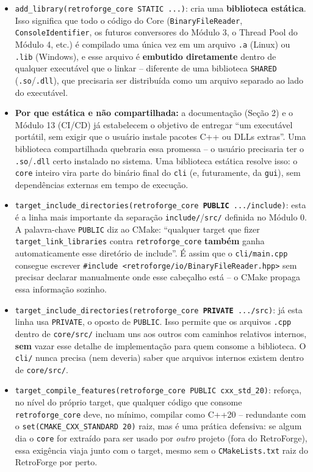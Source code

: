 \begin{itemize}
    \item \texttt{add\_library(retroforge\_core STATIC ...)}: cria uma \textbf{biblioteca estática}. Isso significa que todo o código do Core (\texttt{BinaryFileReader}, \texttt{ConsoleIdentifier}, os futuros conversores do Módulo 3, o Thread Pool do Módulo 4, etc.) é compilado uma única vez em um arquivo \texttt{.a} (Linux) ou \texttt{.lib} (Windows), e esse arquivo é \textbf{embutido diretamente} dentro de qualquer executável que o linkar -- diferente de uma biblioteca \texttt{SHARED} (\texttt{.so}/\texttt{.dll}), que precisaria ser distribuída como um arquivo separado ao lado do executável.
    \item \textbf{Por que estática e não compartilhada:} a documentação (Seção 2) e o Módulo 13 (CI/CD) já estabelecem o objetivo de entregar ``um executável portátil, sem exigir que o usuário instale pacotes C++ ou DLLs extras''. Uma biblioteca compartilhada quebraria essa promessa -- o usuário precisaria ter o \texttt{.so}/\texttt{.dll} certo instalado no sistema. Uma biblioteca estática resolve isso: o \texttt{core} inteiro vira parte do binário final do \texttt{cli} (e, futuramente, da \texttt{gui}), sem dependências externas em tempo de execução.
    \item \texttt{target\_include\_directories(retroforge\_core \textbf{PUBLIC} .../include)}: esta é a linha mais importante da separação \texttt{include/}/\texttt{src/} definida no Módulo 0. A palavra-chave \texttt{PUBLIC} diz ao CMake: ``qualquer target que fizer \texttt{target\_link\_libraries} contra \texttt{retroforge\_core} \textbf{também} ganha automaticamente esse diretório de include''. É assim que o \texttt{cli/main.cpp} consegue escrever \texttt{\#include <retroforge/io/BinaryFileReader.hpp>} sem precisar declarar manualmente onde esse cabeçalho está -- o CMake propaga essa informação sozinho.
    \item \texttt{target\_include\_directories(retroforge\_core \textbf{PRIVATE} .../src)}: já esta linha usa \texttt{PRIVATE}, o oposto de \texttt{PUBLIC}. Isso permite que os arquivos \texttt{.cpp} dentro de \texttt{core/src/} incluam uns aos outros com caminhos relativos internos, \textbf{sem} vazar esse detalhe de implementação para quem consome a biblioteca. O \texttt{cli/} nunca precisa (nem deveria) saber que arquivos internos existem dentro de \texttt{core/src/}.
    \item \texttt{target\_compile\_features(retroforge\_core PUBLIC cxx\_std\_20)}: reforça, no nível do próprio target, que qualquer código que consome \texttt{retroforge\_core} deve, no mínimo, compilar como C++20 -- redundante com o \texttt{set(CMAKE\_CXX\_STANDARD 20)} raiz, mas é uma prática defensiva: se algum dia o \texttt{core} for extraído para ser usado por \textit{outro} projeto (fora do RetroForge), essa exigência viaja junto com o target, mesmo sem o \texttt{CMakeLists.txt} raiz do RetroForge por perto.
\end{itemize}

